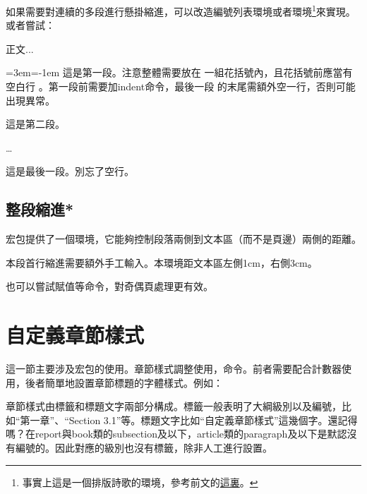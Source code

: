 如果需要對連續的多段進行懸掛縮進，可以改造編號列表環境或者環境\footnote{事實上這是一個排版詩歌的環境，參考前文的\hyperref[envi:verse]{這裏}。}來實現。或者嘗試：

\begin{codeshow}
正文...

{\leftskip=3em\parindent=-1em
\indent 這是第一段。注意整體需要放在
一組花括號內，且花括號前應當有空白行
。第一段前需要加indent命令，最後一段
的末尾需額外空一行，否則可能出現異常。

這是第二段。

\ldots

這是最後一段。別忘了空行。

}
\end{codeshow}

\subsection{整段縮進*}
宏包提供了一個環境，它能夠控制段落兩側到文本區（而不是頁邊）兩側的距離。
\begin{latex}
\begin{adjustwidth}{1cm}{3cm}
本段首行縮進需要額外手工輸入。本環境距文本區左側1cm，右側3cm。
\end{adjustwidth}
\end{latex}

也可以嘗試賦值等命令，對奇偶頁處理更有效。

\section{自定義章節樣式}
\label{sec:titlesec}
這一節主要涉及宏包的使用。章節樣式調整使用，命令。前者需要配合計數器使用，後者簡單地設置章節標題的字體樣式。例如：

章節樣式由標籤和標題文字兩部分構成。標籤一般表明了大綱級別以及編號，比如“第一章”、“Section 3.1”等。標題文字比如“自定義章節樣式”這幾個字。還記得嗎？在report與book類的subsection及以下，article類的paragraph及以下是默認沒有編號的。因此對應的級別也沒有標籤，除非人工進行設置。


